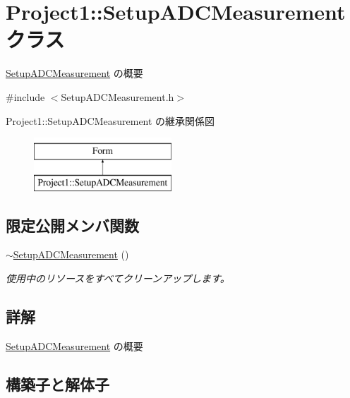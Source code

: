 \hypertarget{class_project1_1_1_setup_a_d_c_measurement}{}\section{Project1\+:\+:Setup\+A\+D\+C\+Measurement クラス}
\label{class_project1_1_1_setup_a_d_c_measurement}


\hyperlink{class_project1_1_1_setup_a_d_c_measurement}{Setup\+A\+D\+C\+Measurement} の概要  




{\ttfamily \#include $<$Setup\+A\+D\+C\+Measurement.\+h$>$}

Project1\+:\+:Setup\+A\+D\+C\+Measurement の継承関係図\begin{figure}[H]
\begin{center}
\leavevmode
\includegraphics[height=2.000000cm]{class_project1_1_1_setup_a_d_c_measurement}
\end{center}
\end{figure}
\subsection*{限定公開メンバ関数}
\begin{DoxyCompactItemize}
\item 
\hyperlink{class_project1_1_1_setup_a_d_c_measurement_a63b1935cc1f23fc96d175fdb9f1f2fd3}{$\sim$\+Setup\+A\+D\+C\+Measurement} ()
\begin{DoxyCompactList}\small\item\em 使用中のリソースをすべてクリーンアップします。 \end{DoxyCompactList}\end{DoxyCompactItemize}


\subsection{詳解}
\hyperlink{class_project1_1_1_setup_a_d_c_measurement}{Setup\+A\+D\+C\+Measurement} の概要 



\subsection{構築子と解体子}
\mbox{\label{class_project1_1_1_setup_a_d_c_measurement_a63b1935cc1f23fc96d175fdb9f1f2fd3}} 
